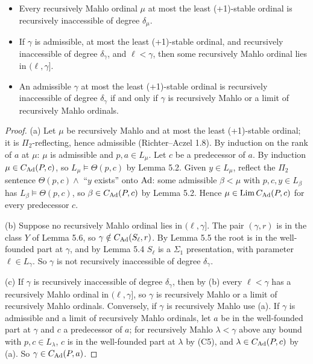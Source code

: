 \documentclass[11pt]{article}
\begin{document}
\begin{statement}
\begin{itemize}
\item[(a)] Every recursively Mahlo ordinal $\mu$ at most the least (+1)-stable ordinal is recursively inaccessible
  of degree $\delta_\mu$.
\item[(b)] If $\gamma$ is admissible, at most the least (+1)-stable ordinal, and recursively inaccessible of degree
  $\delta_\gamma$, and $\ell < \gamma$, then some recursively Mahlo ordinal lies in $(\ell, \gamma]$.
\item[(c)] An admissible $\gamma$ at most the least (+1)-stable ordinal is recursively inaccessible of degree $\delta_\gamma$ if and only if
  $\gamma$ is recursively Mahlo or a limit of recursively Mahlo ordinals.
\end{itemize}
\end{statement}

\begin{proof}
(a) Let $\mu$ be recursively Mahlo and at most the least (+1)-stable ordinal; it is $\Pi_2$-reflecting, hence admissible (Richter--Aczel 1.8). By
induction on the rank of $a$ at $\mu$: $\mu$ is admissible and $p, a \in L_\mu$. Let $c$ be a predecessor of $a$. By
induction $\mu \in C_{\mathrm{Ad}}(P,c)$, so $L_\mu \models \Theta(p,c)$ by Lemma 5.2. Given $y \in L_\mu$, reflect the $\Pi_2$
sentence $\Theta(p,c) \wedge$ ``$y$ exists'' onto $\mathrm{Ad}$: some admissible $\beta < \mu$ with $p, c, y \in L_\beta$ has
$L_\beta \models \Theta(p,c)$, so $\beta \in C_{\mathrm{Ad}}(P,c)$ by Lemma 5.2. Hence $\mu \in \mathrm{Lim}\, C_{\mathrm{Ad}}(P,c)$ for every
predecessor $c$.

(b) Suppose no recursively Mahlo ordinal lies in $(\ell, \gamma]$. The pair $(\gamma, r)$ is in the class $Y$ of Lemma
5.6, so $\gamma \notin C_{\mathrm{Ad}}(S_\ell, r)$. By Lemma 5.5 the root is in the well-founded part at $\gamma$, and by Lemma 5.4
$S_\ell$ is a $\Sigma_1$ presentation, with parameter $\ell \in L_\gamma$. So $\gamma$ is not recursively inaccessible
of degree $\delta_\gamma$.

(c) If $\gamma$ is recursively inaccessible of degree $\delta_\gamma$, then by (b) every $\ell < \gamma$ has a
recursively Mahlo ordinal in $(\ell, \gamma]$, so $\gamma$ is recursively Mahlo or a limit of recursively Mahlo
ordinals. Conversely, if $\gamma$ is recursively Mahlo use (a). If $\gamma$ is admissible and a limit of recursively
Mahlo ordinals, let $a$ be in the well-founded part at $\gamma$ and $c$ a predecessor of $a$; for recursively Mahlo
$\lambda < \gamma$ above any bound with $p, c \in L_\lambda$, $c$ is in the well-founded part at $\lambda$ by (C5), and
$\lambda \in C_{\mathrm{Ad}}(P,c)$ by (a). So $\gamma \in C_{\mathrm{Ad}}(P,a)$.
\end{proof}
\end{document}

